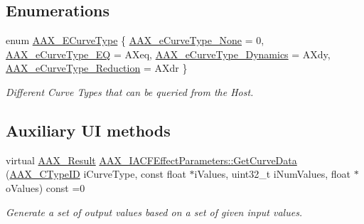  \subsection*{Enumerations}
\begin{DoxyCompactItemize}
\item 
enum \mbox{\hyperlink{a00812_ga59c73d8f51c5c55d54a728eff39da884}{A\+A\+X\+\_\+\+E\+Curve\+Type}} \{ \mbox{\hyperlink{a00812_gga59c73d8f51c5c55d54a728eff39da884a115d7543992756d3474f944f31bcc784}{A\+A\+X\+\_\+e\+Curve\+Type\+\_\+\+None}} = 0, 
\mbox{\hyperlink{a00812_gga59c73d8f51c5c55d54a728eff39da884a01b32d7031ceff45f7acad05dcddad19}{A\+A\+X\+\_\+e\+Curve\+Type\+\_\+\+EQ}} = \textquotesingle{}A\+Xeq\textquotesingle{}, 
\mbox{\hyperlink{a00812_gga59c73d8f51c5c55d54a728eff39da884aed3949ae429e38e979f7d005759c579e}{A\+A\+X\+\_\+e\+Curve\+Type\+\_\+\+Dynamics}} = \textquotesingle{}A\+Xdy\textquotesingle{}, 
\mbox{\hyperlink{a00812_gga59c73d8f51c5c55d54a728eff39da884a011b1b00d6189a8903735dcae2f8bc93}{A\+A\+X\+\_\+e\+Curve\+Type\+\_\+\+Reduction}} = \textquotesingle{}A\+Xdr\textquotesingle{}
 \}
\begin{DoxyCompactList}\small\item\em Different Curve Types that can be queried from the Host. \end{DoxyCompactList}\end{DoxyCompactItemize}
\subsection*{Auxiliary UI methods}
\begin{DoxyCompactItemize}
\item 
virtual \mbox{\hyperlink{a00392_a4d8f69a697df7f70c3a8e9b8ee130d2f}{A\+A\+X\+\_\+\+Result}} \mbox{\hyperlink{a00812_gaa85bda4027342eb644a9c92a17da6d49}{A\+A\+X\+\_\+\+I\+A\+C\+F\+Effect\+Parameters\+::\+Get\+Curve\+Data}} (\mbox{\hyperlink{a00392_ac678f9c1fbcc26315d209f71a147a175}{A\+A\+X\+\_\+\+C\+Type\+ID}} i\+Curve\+Type, const float $\ast$i\+Values, uint32\+\_\+t i\+Num\+Values, float $\ast$o\+Values) const =0
\begin{DoxyCompactList}\small\item\em Generate a set of output values based on a set of given input values. \end{DoxyCompactList}\end{DoxyCompactItemize}
